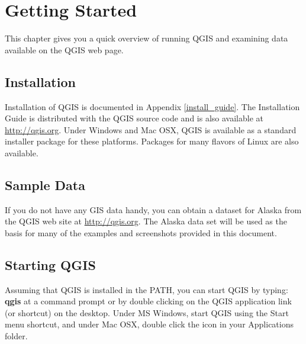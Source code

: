 \chapter{Getting Started}

This chapter gives you a quick overview of running QGIS and examining data available on the QGIS web page.


\section{Installation}
Installation of QGIS is documented in Appendix \ref{install_guide}. The
Installation Guide is distributed with the QGIS source code and is also
available at \url{http://qgis.org}. Under Windows and Mac OSX, QGIS is
available as a standard installer package for these platforms. Packages for
many flavors of Linux are also available. 


\section{Sample Data}
 If you do not have any GIS data handy, you can obtain a
dataset for Alaska from the QGIS web site at \url{http://qgis.org}. The Alaska
data set will be used as the basis for many of the examples and screenshots
provided in this document.


\section{Starting QGIS}

Assuming that QGIS is installed in the PATH, you can start QGIS by typing:
\textbf{qgis}  at a command prompt or by double clicking on the QGIS
application link (or shortcut) on the desktop. Under MS Windows, start QGIS
using the Start menu shortcut, and under Mac OSX, double click the icon in
your Applications folder.
